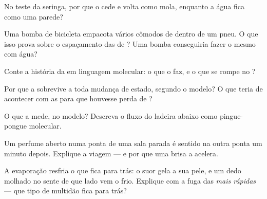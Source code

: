\begin{exercise}[$\star$]\label{exo:g7:states-of-matter:3}
No teste da seringa, por que o  cede e volta como mola, enquanto a
água fica como uma parede?
\end{exercise}

\begin{exercise}[$\star$]\label{exo:g7:states-of-matter:4}
Uma bomba de bicicleta empacota vários cômodos de  dentro de um
pneu. O que isso prova sobre o espaçamento das  de ? Uma
bomba conseguiria fazer o mesmo com água?
\end{exercise}

\begin{exercise}[$\star$]\label{exo:g7:states-of-matter:5}
Conte a história da  em linguagem molecular: o que o  faz,
e o que se rompe no ?
\end{exercise}

\begin{exercise}[$\star$]\label{exo:g7:states-of-matter:6}
Por que a  sobrevive a toda mudança de estado, segundo o modelo?
O que teria de acontecer com as  para que houvesse perda de
?
\end{exercise}

\begin{exercise}[$\star$]\label{exo:g7:states-of-matter:7}
O que a  mede, no modelo? Descreva o fluxo do 
ladeira abaixo como pingue-pongue molecular.
\end{exercise}

\begin{exercise}[$\star$]\label{exo:g7:states-of-matter:8}
Um perfume aberto numa ponta de uma sala parada é sentido na outra
ponta um minuto depois. Explique a viagem --- e por que uma brisa a
acelera.
\end{exercise}

\begin{exercise}[$\star\star$]\label{exo:g7:states-of-matter:9}
A evaporação resfria o que fica para trás: o suor gela a sua pele, e
um dedo molhado no  sente de que lado vem o  frio. Explique
com a fuga das  \emph{mais rápidas} --- que tipo de multidão
fica para trás?
\end{exercise}

